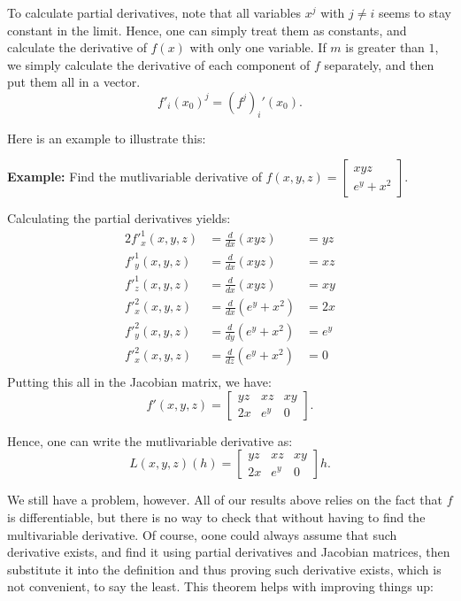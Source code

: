To calculate partial derivatives, note that all variables \( x^{j} \) with \( j
\neq  i\) seems to stay constant in the limit. Hence, one can simply treat them
as constants, and calculate the derivative of \( f(x) \) with only one variable.
If \( m \) is greater than \( 1 \), we simply calculate the derivative of each
component of \( f \) separately, and then put them all in a vector.
\[
  f'_{i}(x_{0})^{j} = (f^{j})_{i}'(x_{0})
.\] 

Here is an example to illustrate this:

\textbf{Example:} Find the mutlivariable derivative of \( f(x, y, z) =
\begin{bmatrix} xyz \\ e^{y} + x^2 \end{bmatrix}  \).

Calculating the partial derivatives yields:
\begin{alignat*}{2}
  f'^{1}_{x}(x, y, z) &= \frac{d}{dx}(xyz) &= yz\\
  f'^{1}_{y}(x, y, z) &= \frac{d}{dx}(xyz) &= xz\\
  f'^{1}_{z}(x, y, z) &= \frac{d}{dx}(xyz) &= xy\\
  f'^{2}_{x}(x, y, z) &= \frac{d}{dx}(e^{y}+x^2) &= 2x\\
  f'^{2}_{y}(x, y, z) &= \frac{d}{dy}(e^{y}+x^2) &= e^{y}\\
  f'^{2}_{x}(x, y, z) &= \frac{d}{dz}(e^{y}+x^2) &= 0\\
\end{alignat*}
Putting this all in the Jacobian matrix, we have:
\[
  f'(x, y, z) = \begin{bmatrix} yz & xz & xy \\ 2x & e^{y} & 0 \end{bmatrix} 
.\] 

Hence, one can write the mutlivariable derivative as:
\[
  L(x, y, z)(h) = \begin{bmatrix} yz & xz & xy \\ 2x & e^{y} & 0 \end{bmatrix} h
.\] 

We still have a problem, however. All of our results above relies on the fact
that \( f \) is differentiable, but there is no way to check that without having
to find the multivariable derivative. Of course, oone could always assume that
such derivative exists, and find it using partial derivatives and Jacobian
matrices, then substitute it into the definition and thus proving such
derivative exists, which is not convenient, to say the least. This theorem helps
with improving things up:

